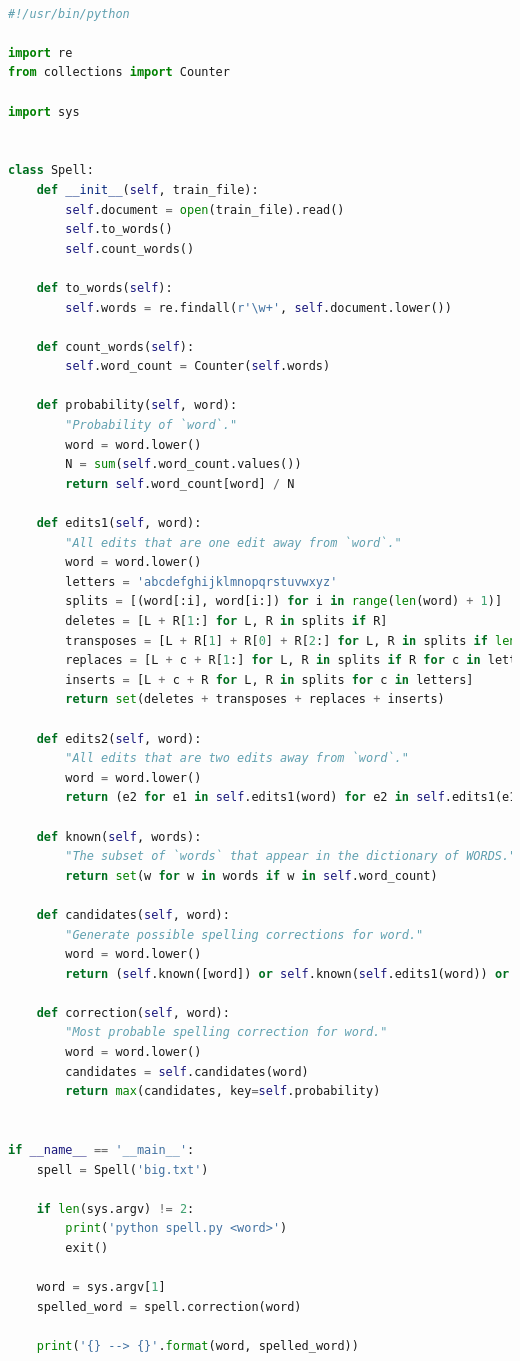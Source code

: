 \documentclass[letterpaper,11pt]{article}
\begin{document}
\begin{lstlisting}[language=python, caption={Spelling corrector}, label={lst:spelling}]

#!/usr/bin/python

import re
from collections import Counter

import sys


class Spell:
    def __init__(self, train_file):
        self.document = open(train_file).read()
        self.to_words()
        self.count_words()

    def to_words(self):
        self.words = re.findall(r'\w+', self.document.lower())

    def count_words(self):
        self.word_count = Counter(self.words)

    def probability(self, word):
        "Probability of `word`."
        word = word.lower()
        N = sum(self.word_count.values())
        return self.word_count[word] / N

    def edits1(self, word):
        "All edits that are one edit away from `word`."
        word = word.lower()
        letters = 'abcdefghijklmnopqrstuvwxyz'
        splits = [(word[:i], word[i:]) for i in range(len(word) + 1)]
        deletes = [L + R[1:] for L, R in splits if R]
        transposes = [L + R[1] + R[0] + R[2:] for L, R in splits if len(R) > 1]
        replaces = [L + c + R[1:] for L, R in splits if R for c in letters]
        inserts = [L + c + R for L, R in splits for c in letters]
        return set(deletes + transposes + replaces + inserts)

    def edits2(self, word):
        "All edits that are two edits away from `word`."
        word = word.lower()
        return (e2 for e1 in self.edits1(word) for e2 in self.edits1(e1))

    def known(self, words):
        "The subset of `words` that appear in the dictionary of WORDS."
        return set(w for w in words if w in self.word_count)

    def candidates(self, word):
        "Generate possible spelling corrections for word."
        word = word.lower()
        return (self.known([word]) or self.known(self.edits1(word)) or self.known(self.edits2(word)) or [word])

    def correction(self, word):
        "Most probable spelling correction for word."
        word = word.lower()
        candidates = self.candidates(word)
        return max(candidates, key=self.probability)


if __name__ == '__main__':
    spell = Spell('big.txt')

    if len(sys.argv) != 2:
        print('python spell.py <word>')
        exit()

    word = sys.argv[1]
    spelled_word = spell.correction(word)

    print('{} --> {}'.format(word, spelled_word))

\end{lstlisting}
\end{document}
